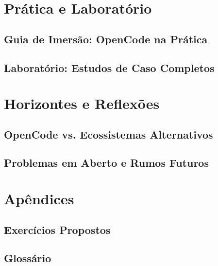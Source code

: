 \documentclass[11pt,fleqn,oneside]{book}
\theoremstyle{definition}
\begin{document}
\part{Prática e Laboratório}
\newpage
\chapter{Guia de Imersão: OpenCode na Prática}
\label{ch:guia-imersao}


\newpage
\chapter{Laboratório: Estudos de Caso Completos}
\label{ch:estudos-caso}


\part{Horizontes e Reflexões}
\newpage
\chapter{OpenCode vs. Ecossistemas Alternativos}
\label{ch:comparacao}


\newpage
\chapter{Problemas em Aberto e Rumos Futuros}
\label{ch:futuro}


\appendix
\part{Apêndices}
\newpage
\chapter{Exercícios Propostos}
\label{ap:exercicios}


\newpage
\chapter{Glossário}
\label{ap:glossario}

\end{document}
